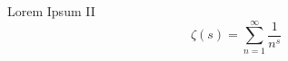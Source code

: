 \begin{titledbox}{Lorem Ipsum II}
    \lipsum[4]
    \begin{equation}
        \zeta (s) = \sum_{n=1}^\infty \frac{1}{n^s}
    \end{equation}
    \lipsum[4]
\end{titledbox}